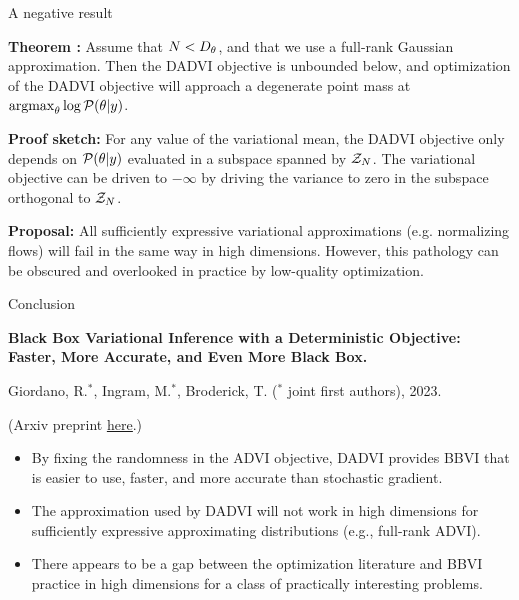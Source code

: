 \documentclass[8pt]{beamer}\usepackage[]{graphicx}\usepackage[]{color}
\begin{document}
\begin{frame}{A negative result}

\noindent
\textbf{Theorem \citep{giordano:2023:dadvi}:}  Assume that $N < {D_{\theta}}$,
and that we use a full-rank Gaussian approximation.  Then the DADVI objective is
unbounded below, and optimization of the DADVI objective will approach a
degenerate point mass at $\operatorname*{\mathrm{argmax}}_\theta \log \mathcal{P}(\theta \vert y)$.


\vspace{2em}
\noindent
\textbf{Proof sketch: }For any value of the variational
mean, the DADVI objective only depends on $\mathcal{P}(\theta \vert y)$ evaluated
in a subspace spanned by $\mathcal{Z}_{N}$.  The variational objective can be driven to 
$-\infty$ by driving the variance to zero in the subspace orthogonal to $\mathcal{Z}_{N}$.


\vspace{2em}
\noindent
\textbf{Proposal: }  All sufficiently expressive variational approximations
(e.g. normalizing flows) will fail in the same way in high dimensions. However,
this pathology can be obscured and overlooked in practice by low-quality
optimization.



\end{frame}




\begin{frame}{Conclusion}


\textbf{Black Box Variational Inference with a Deterministic
Objective: Faster, More Accurate, and Even More Black Box.}

Giordano, R.$^*$, Ingram, M.$^*$, Broderick, T.
($^*$ joint first authors), 2023.

(Arxiv preprint \href{https://arxiv.org/pdf/2304.05527.pdf}{\underline{here}}.)

\vspace{2em}
%
\begin{itemize}
    \item By fixing the randomness in the ADVI objective, DADVI provides 
        BBVI that is easier to use, faster, and more accurate than stochastic gradient.
    \item The approximation used by DADVI will not work in high dimensions
        for sufficiently expressive approximating distributions (e.g., 
        full-rank ADVI).
    \item There appears to be a gap between the optimization literature and 
        BBVI practice in high dimensions for a class of practically interesting
        problems.
\end{itemize}
%



\end{frame}
\end{document}
